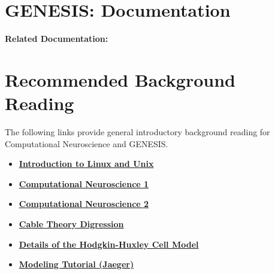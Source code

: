 \documentclass[12pt]{article}
\begin{document}
\section*{GENESIS: Documentation}

{\bf Related Documentation:}

\section*{Recommended Background Reading}

The following links provide general introductory background reading for Computational Neuroscience and GENESIS.

\begin{itemize}
\item \href{../unix-linux/unix-linux.tex}{\bf Introduction to Linux and Unix}
\item \href{../compneurosci1/compneurosci1.tex}{\bf Computational Neuroscience 1}
\item \href{../compneurosci1/compneurosci2.tex}{\bf Computational Neuroscience 2}
\item \href{../cable-theory-digression/cable-theory-digression.tex}{\bf Cable Theory Digression}
\item \href{../hh-model-details/hh-model-details.tex}{\bf Details of the Hodgkin-Huxley Cell Model}
\item \href{../tutorial-jaeger/tutorial-jaeger.pdf}{\bf Modeling Tutorial (Jaeger)}
\end{itemize}
\end{document}
